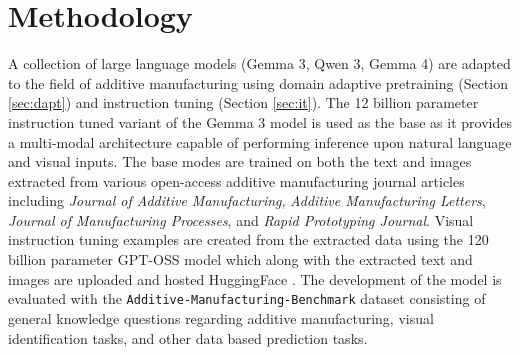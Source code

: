 \section{Methodology}

A collection of large language models (Gemma 3, Qwen 3, Gemma 4) are adapted to
the field of additive manufacturing using domain adaptive pretraining (Section
\ref{sec:dapt}) and instruction tuning (Section \ref{sec:it}). The 12 billion
parameter instruction tuned variant of the Gemma 3 model \cite{team_gemma_2025}
is used as the base as it provides a multi-modal architecture capable of
performing inference upon natural language and visual inputs. The base modes are
trained on both the text and images extracted from various open-access additive
manufacturing journal articles including \textit{Journal of Additive
Manufacturing}, \textit{Additive Manufacturing Letters}, \textit{Journal of
Manufacturing Processes}, and \textit{Rapid Prototyping Journal}. Visual
instruction tuning examples are created from the extracted data using the 120
billion parameter GPT-OSS model which along with the extracted text and images
are uploaded and hosted HuggingFace \cite{peter_pak_additivellm2-oa_2026}. The
development of the model is evaluated with the
\texttt{Additive-Manufacturing-Benchmark} dataset consisting of general
knowledge questions regarding additive manufacturing, visual identification
tasks, and other data based prediction tasks.

